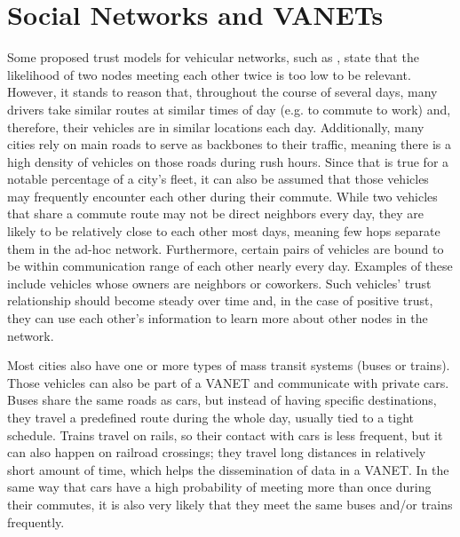 \section{Social Networks and VANETs}
\label{section:socialvanets}
Some proposed trust models for vehicular networks, such as \cite{huang2014social}, state that the likelihood of two nodes meeting each other twice is too low to be relevant.
However, it stands to reason that, throughout the course of several days, many drivers take similar routes at similar times of day (e.g. to commute to work) and, therefore, their vehicles are in similar locations each day.
Additionally, many cities rely on main roads to serve as backbones to their traffic, meaning there is a high density of vehicles on those roads during rush hours.
Since that is true for a notable percentage of a city's fleet, it can also be assumed that those vehicles may frequently encounter each other during their commute.
While two vehicles that share a commute route may not be direct neighbors every day, they are likely to be relatively close to each other most days, meaning few hops separate them in the ad-hoc network.
Furthermore, certain pairs of vehicles are bound to be within communication range of each other nearly every day.
Examples of these include vehicles whose owners are neighbors or coworkers.
Such vehicles' trust relationship should become steady over time and, in the case of positive trust, they can use each other's information to learn more about other nodes in the network.



Most cities also have one or more types of mass transit systems (buses or trains).
Those vehicles can also be part of a VANET and communicate with private cars.
Buses share the same roads as cars, but instead of having specific destinations, they travel a predefined route during the whole day, usually tied to a tight schedule.
Trains travel on rails, so their contact with cars is less frequent, but it can also happen on railroad crossings; they travel long distances in relatively short amount of time, which helps the dissemination of data in a VANET.
In the same way that cars have a high probability of meeting more than once during their commutes, it is also very likely that they meet the same buses and/or trains frequently.

